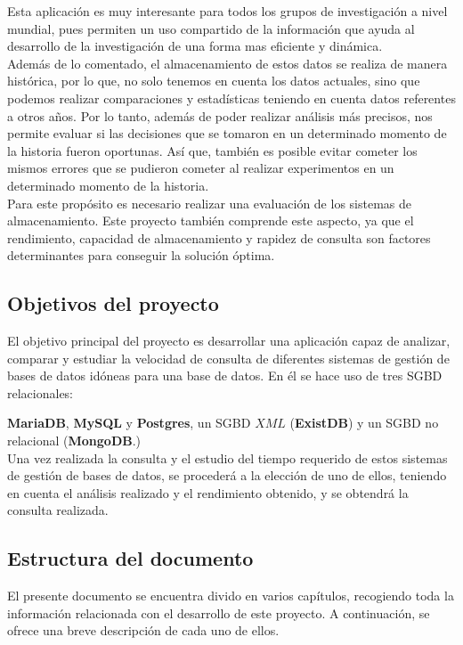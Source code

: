 \documentclass[12pt,a4paper]{article}
\begin{document}
Esta aplicación es muy interesante para todos los grupos de investigación a nivel mundial, pues permiten un uso compartido de la información que ayuda al desarrollo de la investigación de una forma mas eficiente y dinámica.\\

Además de lo comentado, el almacenamiento de estos datos se realiza de manera histórica, por lo que, no solo tenemos en cuenta los datos actuales, sino que podemos realizar comparaciones y estadísticas teniendo en cuenta datos referentes a otros años. Por lo tanto, además de poder realizar análisis más precisos, nos permite evaluar si las decisiones que se tomaron en un determinado momento de la historia fueron oportunas. Así que, también es posible evitar cometer los mismos errores que se pudieron cometer al realizar experimentos en un determinado momento de la historia.\\

Para este propósito es necesario realizar una evaluación de los sistemas de almacenamiento. Este proyecto también comprende este aspecto, ya que el rendimiento, capacidad de almacenamiento y rapidez de consulta son factores determinantes para conseguir la solución óptima.

\newpage

\subsection{Objetivos del proyecto} \label{pto13}

El objetivo principal del proyecto es desarrollar una aplicación capaz de analizar, comparar y estudiar la velocidad de consulta de diferentes sistemas de gestión de bases de datos idóneas para una base de datos. En él se hace uso de tres SGBD relacionales: 

\textbf{MariaDB}, \textbf{MySQL} y \textbf{Postgres}, un SGBD $XML$ (\textbf{ExistDB}) y un SGBD no relacional (\textbf{MongoDB}.)\\

Una vez realizada la consulta y el estudio del tiempo requerido de estos sistemas de gestión de bases de datos, se procederá a la elección de uno de ellos, teniendo en cuenta el análisis realizado y el rendimiento obtenido, y se obtendrá la consulta realizada.

\subsection{Estructura del documento} \label{pto14}
El presente documento se encuentra divido en varios capítulos, recogiendo toda la información relacionada con el desarrollo de este proyecto. A continuación, se ofrece una breve descripción de cada uno de ellos. 
\end{document}
